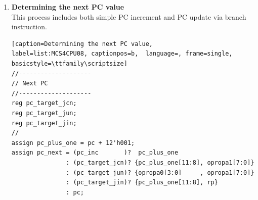 \begin{enumerate}[(1)]
\item \textbf{Determining the next PC value}\\
This process includes both simple PC increment and PC update via branch instruction.
\\
\begin{lstlisting}[caption=Determining the next PC value, 
label=list:MCS4CPU08, captionpos=b,  language=, frame=single, basicstyle=\ttfamily\scriptsize]
//--------------------
// Next PC
//--------------------
reg pc_target_jcn;
reg pc_target_jun;
reg pc_target_jin;
//
assign pc_plus_one = pc + 12'h001;
assign pc_next = (pc_inc       )?  pc_plus_one
               : (pc_target_jcn)? {pc_plus_one[11:8], opropa1[7:0]}
               : (pc_target_jun)? {opropa0[3:0]     , opropa1[7:0]}
               : (pc_target_jin)? {pc_plus_one[11:8], rp}
               : pc;
\end{lstlisting}


\end{enumerate}
